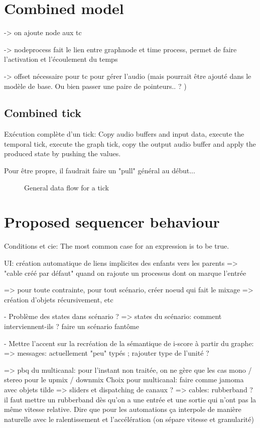 \documentclass[applsci,article,submit,moreauthors,pdftex,10pt,a4paper]{mdpi}
\begin{document}
\section{Combined model}
-> on ajoute node aux tc

-> nodeprocess fait le lien entre graphnode et time process, permet de faire l'activation et l'écoulement du temps

-> offset nécessaire pour tc pour gérer l'audio (mais pourrait être ajouté dans le modèle de base. Ou bien passer une paire de pointeurs.. ? )

\subsection{Combined tick}
Exécution complète d'un tick: 
Copy audio buffers and input data, execute the temporal tick, execute the graph tick, copy the output audio buffer and apply the produced state by pushing the values.

Pour être propre, il faudrait faire un "pull" général au début...
\begin{figure}
	\caption{General data flow for a tick}
\end{figure}

\section{Proposed sequencer behaviour}
Conditions et cie: The most common case for an expression is to be true.

UI: création automatique de liens implicites des enfants vers les parents
=> "cable créé par défaut" quand on rajoute un processus dont on marque l'entrée

=> pour toute contrainte, pour tout scénario, créer noeud qui fait le mixage
=> création d'objets récursivement, etc

- Problème des states dans scénario ?
=> states du scénario: comment interviennent-ils ? faire un scénario fantôme 


- Mettre l'accent sur la recréation de la sémantique de i-score à partir du graphe: 
=> messages: actuellement "peu" typés ; rajouter type de l'unité ? 

=> pbq du multicanal: pour l'instant non traitée, on ne gère que les cas mono / stereo pour le upmix / downmix
Choix pour multicanal: faire comme jamoma avec objets tilde
=> sliders et dispatching de canaux ?
=> cables: rubberband ? il faut mettre un rubberband dès qu'on a une entrée et une sortie qui n'ont pas la même vitesse relative. Dire que pour les automations ça interpole de manière naturelle avec le ralentissement et l'accélération (on sépare vitesse et granularité)
\end{document}
